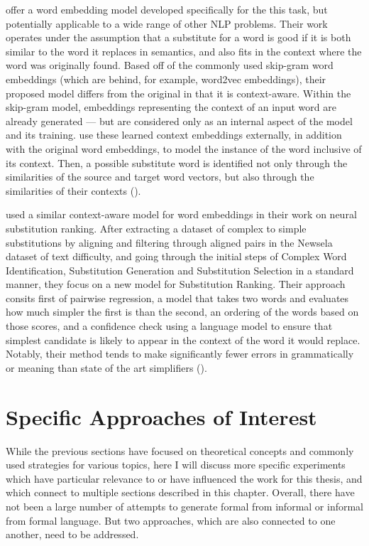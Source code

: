 \cite{melamud2015simple} offer a word embedding model developed specifically for the this task, but potentially applicable to a wide range of other NLP problems. Their work operates under the assumption that a substitute for a word is good if it is both similar to the word it replaces in semantics, and also fits in the context where the word was originally found. Based off of the commonly used skip-gram word embeddings (which are behind, for example, word2vec embeddings), their proposed model differs from the original in that it is context-aware. Within the skip-gram model, embeddings representing the context of an input word are already generated --- but are considered only as an internal aspect of the model and its training. \cite{melamud2015simple} use these learned context embeddings externally, in addition with the original word embeddings, to model the instance of the word inclusive of its context. Then, a possible substitute word is identified not only through the similarities of the source and target word vectors, but also through the similarities of their contexts (\cite{melamud2015simple}).

\cite{paetzold2017lexical} used a similar context-aware model for word embeddings in their work on neural substitution ranking. After extracting a dataset of complex to simple substitutions by aligning and filtering through aligned pairs in the Newsela dataset of text difficulty, and going through the initial steps of Complex Word Identification, Substitution Generation and Substitution Selection in a standard manner, they focus on a new model for Substitution Ranking. Their approach consits first of pairwise regression, a model that takes two words and evaluates how much simpler the first is than the second, an ordering of the words based on those scores, and a confidence check using a language model to ensure that simplest candidate is likely to appear in the context of the word it would replace. Notably, their method tends to make significantly fewer errors in grammatically or meaning than state of the art simplifiers (\cite{paetzold2017lexical}).

\section{Specific Approaches of Interest}

While the previous sections have focused on theoretical concepts and commonly used strategies for various topics, here I will discuss more specific experiments which have particular relevance to or have influenced the work for this thesis, and which connect to multiple sections described in this chapter. Overall, there have not been a large number of attempts to generate formal from informal or informal from formal language. But two approaches, which are also connected to one another, need to be addressed.

